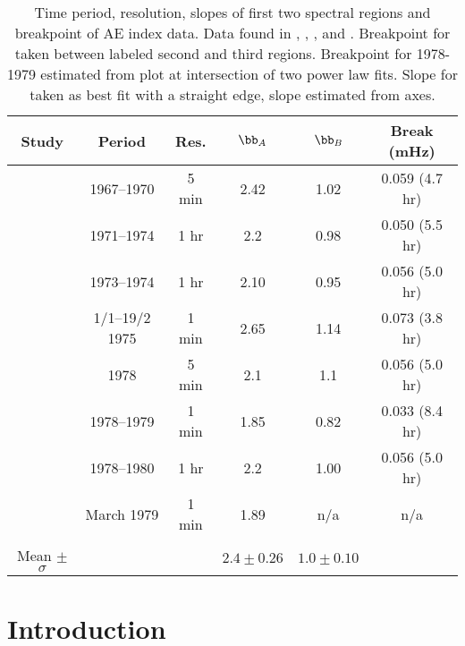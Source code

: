 \begin{table*}
\caption[Time period, resolution, slopes of first two spectral regions
  and breakpoint of AE index data.]{Time period, resolution, slopes of
  first two spectral regions and breakpoint of AE index data.  Data
  found in \cite{tsurutani90a}, 
  \cite{consolini96a}, \cite{uritsky98a}, \cite{price01a} and
  \cite{watkins02a}.   Breakpoint for \cite{consolini96a} taken between
  labeled second and third regions.  Breakpoint for \cite{price01a}
  1978-1979 estimated from plot at intersection of two power law fits.
  Slope for \cite{watkins02a} taken as best fit
  with a straight edge, slope estimated from axes.}  \vspace{12pt}

\begin{tabular}{c | c | c | c | c | c}
Study & Period & Res. & $\bb_A$ & $\bb_B$ & Break (mHz) \\
\hline
\cite{tsurutani90a} & 1967--1970 & 5 min & 2.42 & 1.02 & 0.059 (4.7 hr) \\
\cite{tsurutani90a} & 1971--1974 & 1 hr  & 2.2  & 0.98 & 0.050 (5.5 hr) \\
\cite{uritsky98a} & 1973--1974 & 1 hr & 2.10 & 0.95 & 0.056 (5.0 hr) \\
\cite{consolini96a} & 1/1--19/2 1975 & 1 min & 2.65 & 1.14 & 0.073 (3.8 hr) \\
\cite{watkins02a} & 1978 & 5 min & 2.1 & 1.1 & 0.056 (5.0 hr) \\
\cite{price01a} & 1978--1979  & 1 min & 1.85 & 0.82 & 0.033 (8.4 hr) \\
\cite{tsurutani90a} & 1978--1980 & 1 hr  & 2.2  & 1.00 & 0.056 (5.0 hr) \\
\cite{price01a} & March 1979 & 1 min & 1.89 & n/a   &  n/a \\
& & & & & \\
Mean $\pm$ $\sigma$ & & & $2.4 \pm 0.26$ & $1.0 \pm 0.10$ & \\
\end{tabular}
\centering
\label{tab:aeslopebreakpoint}
\end{table*}

\section{Introduction}
\label{sec:partII_introduction}

